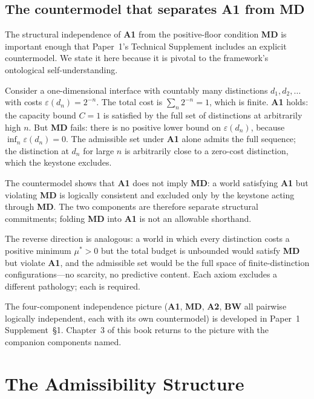 \documentclass[11pt]{article}
\newcommand{\Aone}{\textbf{A1}}
\begin{document}
\subsection{The countermodel that separates A1 from MD}\label{sec:A1_countermodel}

The structural independence of \Aone{} from the positive-floor condition \textbf{MD} is important enough that Paper~1's Technical Supplement includes an explicit countermodel. We state it here because it is pivotal to the framework's ontological self-understanding.

Consider a one-dimensional interface with countably many distinctions $d_1, d_2, \dots$ with costs $\varepsilon(d_n) = 2^{-n}$. The total cost is $\sum_n 2^{-n} = 1$, which is finite. \Aone{} holds: the capacity bound $C = 1$ is satisfied by the full set of distinctions at arbitrarily high $n$. But \textbf{MD} fails: there is no positive lower bound on $\varepsilon(d_n)$, because $\inf_n \varepsilon(d_n) = 0$. The admissible set under \Aone{} alone admits the full sequence; the distinction at $d_n$ for large $n$ is arbitrarily close to a zero-cost distinction, which the keystone excludes.

The countermodel shows that \Aone{} does not imply \textbf{MD}: a world satisfying \Aone{} but violating \textbf{MD} is logically consistent and excluded only by the keystone acting through \textbf{MD}. The two components are therefore separate structural commitments; folding \textbf{MD} into \Aone{} is not an allowable shorthand.

The reverse direction is analogous: a world in which every distinction costs a positive minimum $\mu^* > 0$ but the total budget is unbounded would satisfy \textbf{MD} but violate \Aone{}, and the admissible set would be the full space of finite-distinction configurations---no scarcity, no predictive content. Each axiom excludes a different pathology; each is required.

The four-component independence picture (\Aone{}, \textbf{MD}, \textbf{A2}, \textbf{BW} all pairwise logically independent, each with its own countermodel) is developed in Paper~1 Supplement~\S1. Chapter~3 of this book returns to the picture with the companion components named.

\clearpage

\section{The Admissibility Structure}\label{sec:admissibility_structure}
\end{document}
